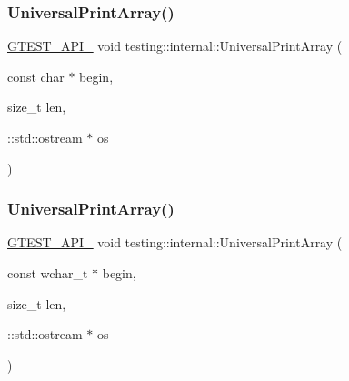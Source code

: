 \subsubsection{\texorpdfstring{UniversalPrintArray()}{UniversalPrintArray()}\hspace{0.1cm}{\footnotesize\ttfamily [4/5]}}
{\footnotesize\ttfamily \mbox{\hyperlink{_obj__test_2lib_2googletest-release-1_88_81_2googletest_2include_2gtest_2internal_2gtest-port_8h_aa73be6f0ba4a7456180a94904ce17790}{G\+T\+E\+S\+T\+\_\+\+A\+P\+I\+\_\+}} void testing\+::internal\+::\+Universal\+Print\+Array (\begin{DoxyParamCaption}\item[{const char $\ast$}]{begin,  }\item[{size\+\_\+t}]{len,  }\item[{\+::std\+::ostream $\ast$}]{os }\end{DoxyParamCaption})}

\mbox{\label{namespacetesting_1_1internal_ae31e146c35fd75afc6a9cc73ae2692d1}} 
\subsubsection{\texorpdfstring{UniversalPrintArray()}{UniversalPrintArray()}\hspace{0.1cm}{\footnotesize\ttfamily [5/5]}}
{\footnotesize\ttfamily \mbox{\hyperlink{_obj__test_2lib_2googletest-release-1_88_81_2googletest_2include_2gtest_2internal_2gtest-port_8h_aa73be6f0ba4a7456180a94904ce17790}{G\+T\+E\+S\+T\+\_\+\+A\+P\+I\+\_\+}} void testing\+::internal\+::\+Universal\+Print\+Array (\begin{DoxyParamCaption}\item[{const wchar\+\_\+t $\ast$}]{begin,  }\item[{size\+\_\+t}]{len,  }\item[{\+::std\+::ostream $\ast$}]{os }\end{DoxyParamCaption})}

\mbox{\label{namespacetesting_1_1internal_afa92f5a284929dc3723e654a25feb7b9}} 
